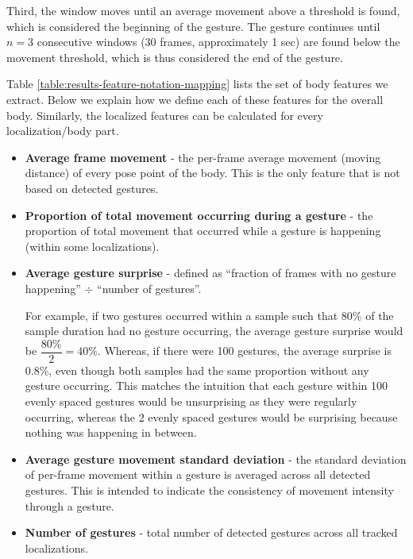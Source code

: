 Third, the window moves until an average movement
above a threshold is found, which is considered the beginning of the gesture.
The gesture continues until $n=3$ consecutive windows (30 frames, approximately 1 sec) are found below the movement threshold, which is thus considered the end of the gesture.



Table \ref{table:results-feature-notation-mapping} lists the set of body features we extract. Below we explain how we define each of these features for the overall body. Similarly, the localized features can be calculated for every localization/body part.
\begin{itemize}\item \textbf{Average frame movement} - the per-frame average movement (moving distance) of every pose point of the body. This is the only feature that is not based on detected gestures.
  \item \textbf{Proportion of total movement occurring during a gesture} - the proportion of total
  movement that occurred while a gesture is happening (within some localizations).
  \item \textbf{Average gesture surprise} - 
  defined as 
  ``fraction of frames with no gesture happening'' $\div$ ``number of gestures''.




  For example, if two gestures occurred within a sample such that 80\% of the sample
  duration had no gesture occurring, the average gesture surprise would be $\dfrac{80\%}{2}=40\%$.
  Whereas, if there were 100 gestures, 
the average surprise is 0.8\%, even though both samples had the same proportion without
  any gesture occurring.
  This matches the intuition that each gesture within 100 evenly spaced gestures would be unsurprising
  as they were regularly occurring, whereas the 2 evenly spaced gestures would be surprising because
  nothing was happening in between.
\item \textbf{Average gesture movement standard deviation} - the standard deviation of per-frame
  movement within a gesture is averaged across all detected gestures.
  This is intended to indicate the consistency of movement intensity
  through a gesture.
  \item \textbf{Number of gestures} - total number of detected gestures across all tracked localizations.




\end{itemize}
